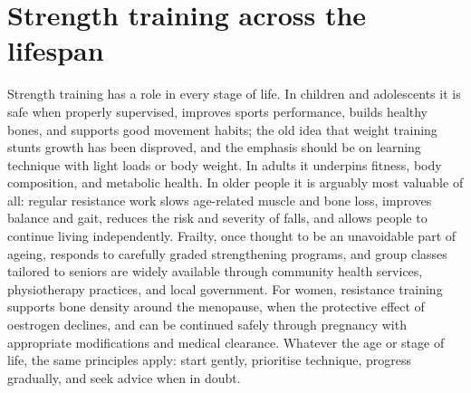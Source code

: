 \section*{Strength training across the lifespan}
Strength training has a role in every stage of life. In children and adolescents it is safe when properly supervised, improves sports performance, builds healthy bones, and supports good movement habits; the old idea that weight training stunts growth has been disproved, and the emphasis should be on learning technique with light loads or body weight. In adults it underpins fitness, body composition, and metabolic health. In older people it is arguably most valuable of all: regular resistance work slows age-related muscle and bone loss, improves balance and gait, reduces the risk and severity of falls, and allows people to continue living independently. Frailty, once thought to be an unavoidable part of ageing, responds to carefully graded strengthening programs, and group classes tailored to seniors are widely available through community health services, physiotherapy practices, and local government. For women, resistance training supports bone density around the menopause, when the protective effect of oestrogen declines, and can be continued safely through pregnancy with appropriate modifications and medical clearance. Whatever the age or stage of life, the same principles apply: start gently, prioritise technique, progress gradually, and seek advice when in doubt.

